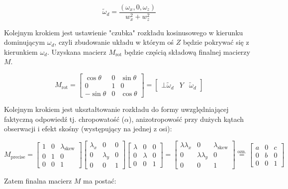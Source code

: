 \documentclass[../main.tex]{subfiles}
\begin{document}
$$
\widetilde{\omega}_d = \frac{
    \left( \omega_x,0,\omega_z \right)
  }{
    w_x^2+w_z^2
  }
$$

Kolejnym krokiem jest ustawienie "czubka" rozkładu kosinusowego w kierunku
dominującym $\omega_d$, czyli zbudowanie układu w którym oś $Z$ będzie
pokrywać się z kierunkiem $\omega_d$. Uzyskana macierz $M_{\text{rot}}$
będzie częścią składową finalnej macierzy $M$.

$$
M_{\text{rot}} =
\begin{bmatrix}
  \cos\theta  & 0     & \sin\theta \\
  0           & 1     & 0 \\
  -\sin\theta & 0     & \cos\theta
\end{bmatrix}
= \begin{bmatrix}
  \bot {\widetilde{\omega}_d} & Y & \widetilde{\omega}_d
\end{bmatrix}
$$

Kolejnym krokiem jest ukształtowanie rozkładu do formy uwzględniającej
faktyczną odpowiedź tj. chropowatość ($\alpha$), anizotropowość przy
dużych kątach obserwacji i efekt skośny (występujący na jednej z osi):

$$
M_{\text{precise}} =
\begin{bmatrix}
  1 & 0 & \lambda_{\text{skew}} \\
  0 & 1 & 0 \\
  0 & 0 & 1
\end{bmatrix}
\begin{bmatrix}
  \lambda_x & 0 & 0 \\
  0 & \lambda_y & 0 \\
  0 & 0 & 1
\end{bmatrix}
\begin{bmatrix}
  \lambda & 0 & 0 \\
  0 & \lambda & 0 \\
  0 & 0 & 1
\end{bmatrix}
=
\begin{bmatrix}
  \lambda\lambda_x & 0 & \lambda_{\text{skew}} \\
  0 & \lambda\lambda_y & 0 \\
  0 & 0 & 1
\end{bmatrix}
\stackrel{\text{ozn.}}{=}
\begin{bmatrix}
  a & 0 & c \\
  0 & b & 0 \\
  0 & 0 & 1
\end{bmatrix}
$$

Zatem finalna macierz $M$ ma postać:
\end{document}
